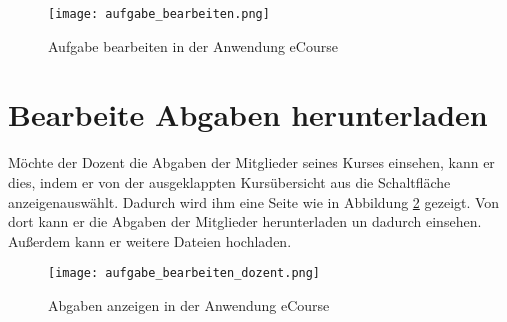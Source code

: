 \begin{figure}[h]
\centering
\texttt{[image: aufgabe\_bearbeiten.png]}
\caption{Aufgabe bearbeiten in der Anwendung eCourse}
\label{fib:aufgabe_bearbeiten}
\end{figure}

\section{Bearbeite Abgaben herunterladen}
\label{sec:herunterladen}
Möchte der Dozent die Abgaben der Mitglieder seines Kurses einsehen, kann er dies, indem er von der ausgeklappten Kursübersicht aus die Schaltfläche \glqq anzeigen\grqq auswählt. Dadurch wird ihm eine Seite wie in Abbildung \ref{fib:aufgabe_bearbeiten} gezeigt. Von dort kann er die Abgaben der Mitglieder herunterladen un dadurch einsehen. Außerdem kann er weitere Dateien hochladen.

\begin{figure}[h]
\centering
\texttt{[image: aufgabe\_bearbeiten\_dozent.png]}
\caption{Abgaben anzeigen in der Anwendung eCourse}
\label{fib:aufgabe_bearbeiten}
\end{figure}
